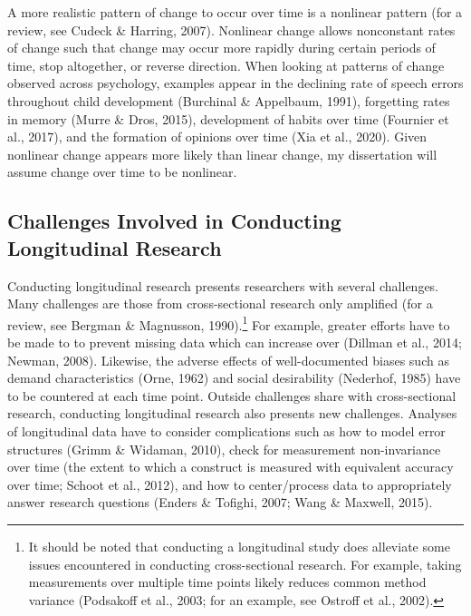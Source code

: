 \documentclass[
  english,
  man,floatsintext]{apa7}
\begin{document}
A more realistic pattern of change to occur over time is a nonlinear pattern (for a review, see Cudeck \& Harring, 2007). Nonlinear change allows nonconstant rates of change such that change may occur more rapidly during certain periods of time, stop altogether, or reverse direction. When looking at patterns of change observed across psychology, examples appear in the declining rate of speech errors throughout child development (Burchinal \& Appelbaum, 1991), forgetting rates in memory (Murre \& Dros, 2015), development of habits over time (Fournier et al., 2017), and the formation of opinions over time (Xia et al., 2020). Given nonlinear change appears more likely than linear change, my dissertation will assume change over time to be nonlinear.

\hypertarget{challenges-involved-in-conducting-longitudinal-research}{%
\subsection{Challenges Involved in Conducting Longitudinal Research}\label{challenges-involved-in-conducting-longitudinal-research}}



Conducting longitudinal research presents researchers with several challenges. Many challenges are those from cross-sectional research only amplified (for a review, see Bergman \& Magnusson, 1990).\footnote{It should be noted that conducting a longitudinal study does alleviate some issues encountered in conducting cross-sectional research. For example, taking measurements over multiple time points likely reduces common method variance (Podsakoff et al., 2003; for an example, see Ostroff et al., 2002).} For example, greater efforts have to be made to to prevent missing data which can increase over (Dillman et al., 2014; Newman, 2008). Likewise, the adverse effects of well-documented biases such as demand characteristics (Orne, 1962) and social desirability (Nederhof, 1985) have to be countered at each time point. Outside challenges share with cross-sectional research, conducting longitudinal research also presents new challenges. Analyses of longitudinal data have to consider complications such as how to model error structures (Grimm \& Widaman, 2010), check for measurement non-invariance over time (the extent to which a construct is measured with equivalent accuracy over time; Schoot et al., 2012), and how to center/process data to appropriately answer research questions (Enders \& Tofighi, 2007; Wang \& Maxwell, 2015).
\end{document}
